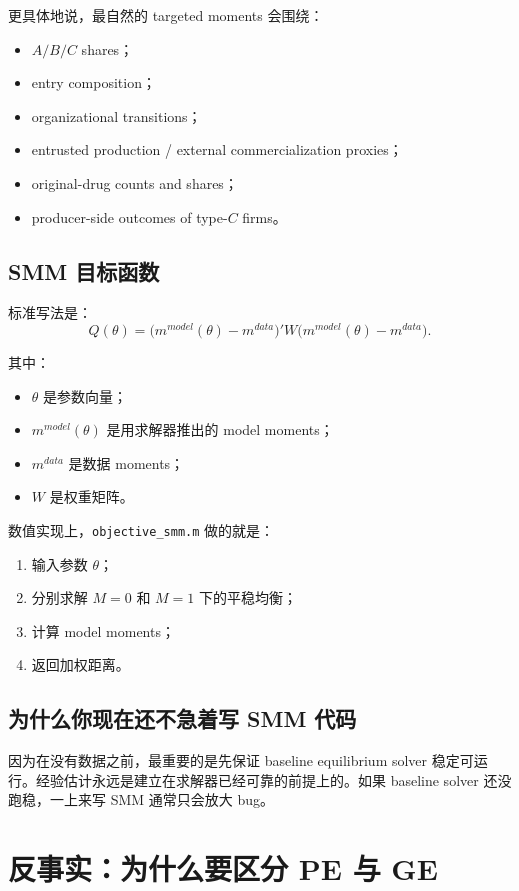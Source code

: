 \documentclass[12pt]{ctexart}
\begin{document}
更具体地说，最自然的 targeted moments 会围绕：
\begin{itemize}
    \item $A/B/C$ shares；
    \item entry composition；
    \item organizational transitions；
    \item entrusted production / external commercialization proxies；
    \item original-drug counts and shares；
    \item producer-side outcomes of type-$C$ firms。
\end{itemize}

\subsection{SMM 目标函数}

标准写法是：
\[
Q(\theta)
=
\big(m^{model}(\theta)-m^{data}\big)'
W
\big(m^{model}(\theta)-m^{data}\big).
\]

其中：
\begin{itemize}
    \item $\theta$ 是参数向量；
    \item $m^{model}(\theta)$ 是用求解器推出的 model moments；
    \item $m^{data}$ 是数据 moments；
    \item $W$ 是权重矩阵。
\end{itemize}

数值实现上，\texttt{objective\_smm.m} 做的就是：
\begin{enumerate}
    \item 输入参数 $\theta$；
    \item 分别求解 $M=0$ 和 $M=1$ 下的平稳均衡；
    \item 计算 model moments；
    \item 返回加权距离。
\end{enumerate}

\subsection{为什么你现在还不急着写 SMM 代码}

因为在没有数据之前，最重要的是先保证 baseline equilibrium solver 稳定可运行。经验估计永远是建立在求解器已经可靠的前提上的。如果 baseline solver 还没跑稳，一上来写 SMM 通常只会放大 bug。

\section{反事实：为什么要区分 PE 与 GE}
\end{document}
